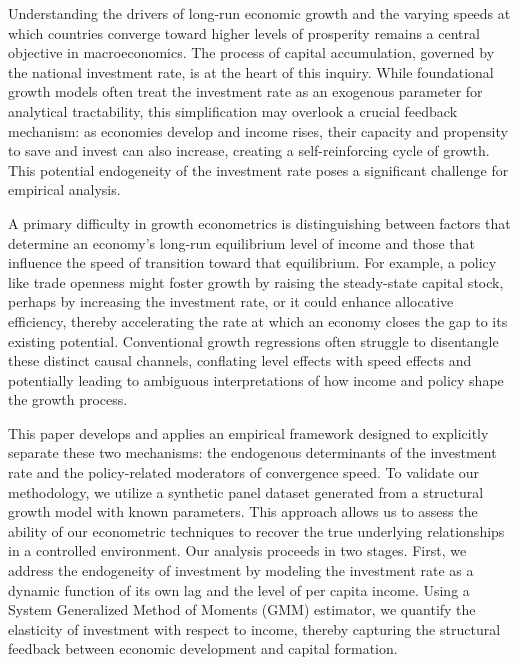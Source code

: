 \documentclass[]{article}
\begin{document}
Understanding the drivers of long-run economic growth and the varying speeds at which countries converge toward higher levels of prosperity remains a central objective in macroeconomics. The process of capital accumulation, governed by the national investment rate, is at the heart of this inquiry. While foundational growth models often treat the investment rate as an exogenous parameter for analytical tractability, this simplification may overlook a crucial feedback mechanism: as economies develop and income rises, their capacity and propensity to save and invest can also increase, creating a self-reinforcing cycle of growth. This potential endogeneity of the investment rate poses a significant challenge for empirical analysis.

A primary difficulty in growth econometrics is distinguishing between factors that determine an economy's long-run equilibrium level of income and those that influence the speed of transition toward that equilibrium. For example, a policy like trade openness might foster growth by raising the steady-state capital stock, perhaps by increasing the investment rate, or it could enhance allocative efficiency, thereby accelerating the rate at which an economy closes the gap to its existing potential. Conventional growth regressions often struggle to disentangle these distinct causal channels, conflating level effects with speed effects and potentially leading to ambiguous interpretations of how income and policy shape the growth process.

This paper develops and applies an empirical framework designed to explicitly separate these two mechanisms: the endogenous determinants of the investment rate and the policy-related moderators of convergence speed. To validate our methodology, we utilize a synthetic panel dataset generated from a structural growth model with known parameters. This approach allows us to assess the ability of our econometric techniques to recover the true underlying relationships in a controlled environment. Our analysis proceeds in two stages. First, we address the endogeneity of investment by modeling the investment rate as a dynamic function of its own lag and the level of per capita income. Using a System Generalized Method of Moments (GMM) estimator, we quantify the elasticity of investment with respect to income, thereby capturing the structural feedback between economic development and capital formation.
\end{document}
